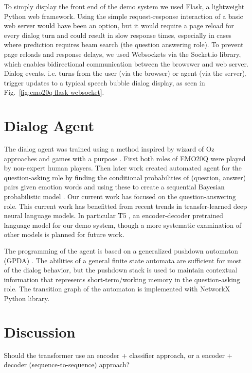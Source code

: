\documentclass[conference]{IEEEtran}
\begin{document}
To simply display the front end of the demo system we used Flask, a
lightweight Python web framework.  Using the simple request-response
interaction of a basic web server would have been an option, but it
would require a page reload for every dialog turn and could result in
slow response times, especially in cases where prediction requires
beam search (the question answering role).  To prevent page reloads
and response delays, we used Websockets via the Socket.io library,
which enables bidirectional communication between the browswer and
web server.  Dialog events, i.e. turns from the user (via the browser)
or agent (via the server), trigger updates to a typical speech bubble
dialog display, as seen in Fig.~\ref{fig:emo20q-flask-websocket}.

\section{Dialog Agent}

The dialog agent was trained using a method inspired by wizard of Oz
approaches \cite{Fraser1991} and games with a purpose
\cite{Ahn2004}. First both roles of EMO20Q were played by non-expert
human players. Then later work created automated agent for the
question-asking role by finding the conditional probabilities of
(question, answer) pairs given emotion words and using these to create
a sequential Bayesian probabilistic model \cite{Kazemzadeh2012}.  Our
current work has focused on the question-answering role.  This current
work has benefitted from recent trends in transfer-learned deep neural
language models.  In particular
T5 \cite{Raffel2020}, an encoder-decoder pretrained language model for
our demo system, though a more systematic examination of other models
is planned for future work.

The programming of the agent is based on a generalized pushdown
automaton (GPDA) \cite{Allauzen2012}.  The abilities of a general
finite state automata are sufficient for most of the dialog behavior,
but the pushdown stack is used to maintain contextual information that
represents short-term/working memory in the question-asking role. The
transition graph of the automaton is implemented with NetworkX Python
library.


\section{Discussion}
Should the transformer use an encoder + classifier approach, or a
encoder + decoder (sequence-to-sequence) approach?
\end{document}
